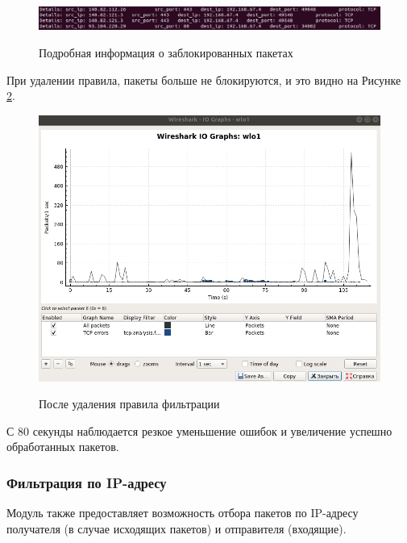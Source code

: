\begin{figure}[h]
	\begin{center}
		{\includegraphics[scale = 0.6]{img/screenshots/rule_protocol/log_drop_packets.png}}
		\caption{Подробная информация о заблокированных пакетах}
		\label{fig17:image}
	\end{center}
\end{figure}

При удалении правила, пакеты больше не блокируются, и это видно на Рисунке \ref{fig18:image}.
\newpage
\begin{figure}[h!]
	\begin{center}
		{\includegraphics[scale = 0.5]{img/screenshots/rule_protocol/3_rule_protocol.png}}
		\caption{После удаления правила фильтрации}
		\label{fig18:image}
	\end{center}
\end{figure}

С 80 секунды наблюдается резкое уменьшение ошибок и увеличение успешно обработанных пакетов. \newline

\subsubsection{Фильтрация по IP-адресу}
Модуль также предоставляет возможность отбора пакетов по IP-адресу получателя (в случае исходящих пакетов) и отправителя (входящие). 

